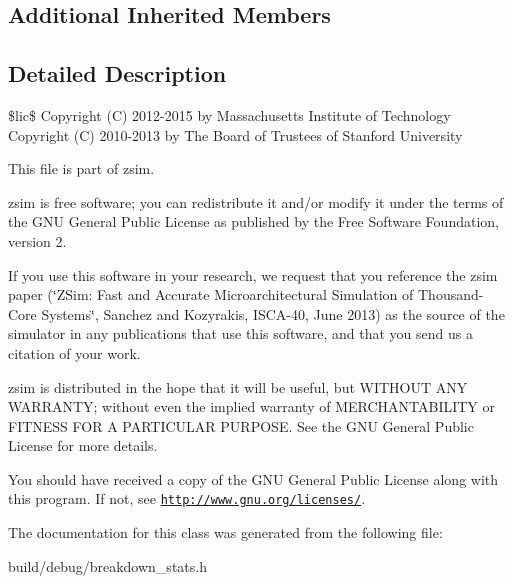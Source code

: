 \subsection*{Additional Inherited Members}


\subsection{Detailed Description}
\$lic\$ Copyright (C) 2012-\/2015 by Massachusetts Institute of Technology Copyright (C) 2010-\/2013 by The Board of Trustees of Stanford University

This file is part of zsim.

zsim is free software; you can redistribute it and/or modify it under the terms of the G\-N\-U General Public License as published by the Free Software Foundation, version 2.

If you use this software in your research, we request that you reference the zsim paper (\char`\"{}\-Z\-Sim\-: Fast and Accurate Microarchitectural Simulation of
\-Thousand-\/\-Core Systems\char`\"{}, Sanchez and Kozyrakis, I\-S\-C\-A-\/40, June 2013) as the source of the simulator in any publications that use this software, and that you send us a citation of your work.

zsim is distributed in the hope that it will be useful, but W\-I\-T\-H\-O\-U\-T A\-N\-Y W\-A\-R\-R\-A\-N\-T\-Y; without even the implied warranty of M\-E\-R\-C\-H\-A\-N\-T\-A\-B\-I\-L\-I\-T\-Y or F\-I\-T\-N\-E\-S\-S F\-O\-R A P\-A\-R\-T\-I\-C\-U\-L\-A\-R P\-U\-R\-P\-O\-S\-E. See the G\-N\-U General Public License for more details.

You should have received a copy of the G\-N\-U General Public License along with this program. If not, see \href{http://www.gnu.org/licenses/}{\tt http\-://www.\-gnu.\-org/licenses/}. 

The documentation for this class was generated from the following file\-:\begin{DoxyCompactItemize}
\item 
build/debug/breakdown\-\_\-stats.\-h\end{DoxyCompactItemize}
